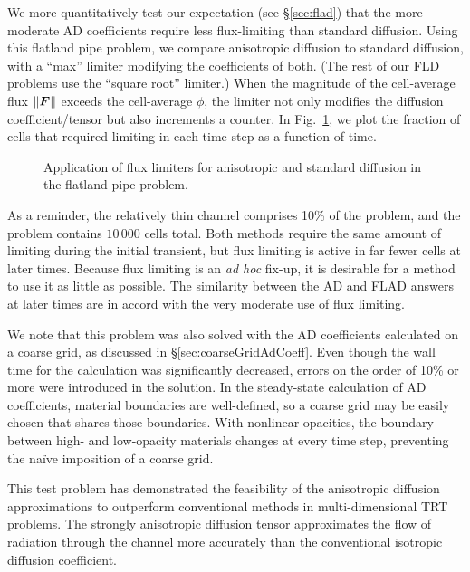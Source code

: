 We more quantitatively test our expectation (see \S\ref{sec:flad}) that the more
moderate AD coefficients require less flux-limiting than standard diffusion.
Using this flatland pipe problem, we compare anisotropic diffusion to
standard diffusion, with a ``max'' limiter modifying the coefficients of both.
(The rest of our FLD problems use the ``square root'' limiter.)
When the magnitude of the cell-average flux $\left\| \bm{F} \right\|$ exceeds the cell-average
$\phi$, the limiter not only modifies the diffusion coefficient/tensor but also
increments a counter. In Fig.~\ref{fig:crashaltFld}, we plot the fraction of
cells that required limiting in each time step as a function of time. 
%
\begin{figure}[htb]
  \centering\small
  
  \caption{Application of flux limiters for anisotropic and standard diffusion
  in the flatland pipe problem.}
  \label{fig:crashaltFld}
\end{figure}
%
As a reminder, the relatively thin channel comprises 10\% of the problem, and
the problem contains $10\,000$ cells total. Both methods require the same
amount of limiting during the initial transient, but flux limiting is active in
far fewer cells at later times. Because flux limiting is an \emph{ad hoc}
fix-up, it is desirable for a method to use it as little as possible.
The similarity between the AD and FLAD answers at later times are in accord
with the very moderate use of flux limiting.

We note that this problem was also solved with the AD coefficients calculated on
a coarse grid, as discussed in \S\ref{sec:coarseGridAdCoeff}. Even though the
wall time for the calculation was significantly decreased, errors on the order
of 10\% or more were introduced in the solution. In the steady-state calculation
of AD coefficients, material boundaries are well-defined, so a coarse grid may
be easily chosen that shares those boundaries. With nonlinear opacities, the
boundary between high- and low-opacity materials changes at every time step,
preventing the na\"ive imposition of a coarse grid.

This test problem has demonstrated the feasibility of the anisotropic diffusion
approximations to outperform conventional methods in multi-dimensional
TRT problems. The strongly anisotropic diffusion tensor approximates the flow of
radiation through the channel more accurately than the conventional isotropic
diffusion coefficient.

\nonthesisclearpage
